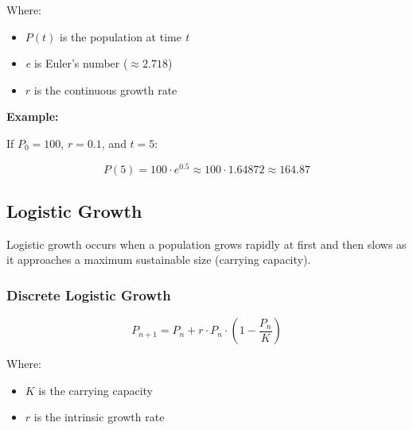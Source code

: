 Where:

\begin{itemize}

  \item \(P(t)\) is the population at time \emph{t}

  \item \emph{e} is Euler’s number (\(\approx 2.718\))

  \item \(r\) is the continuous growth rate

\end{itemize}

\textbf{Example:}
\vspace{\baselineskip}
  
If \(P_0 = 100\), \(r = 0.1\), and \(t = 5\):

\[
    P(5) = 100 \cdot e^{0.5} \approx 100 \cdot 1.64872 \approx 164.87
\]

\begin{center}
\end{center}

\subsection{Logistic Growth}

Logistic growth occurs when a population grows rapidly at first and then slows as it approaches a maximum sustainable size (carrying capacity).

\subsubsection{Discrete Logistic Growth}

\[
    P_{n+1} = P_n + r \cdot P_n \cdot \left(1 - \frac{P_n}{K}\right)
\]

Where:

\begin{itemize}

  \item \(K\) is the carrying capacity

  \item \(r\) is the intrinsic growth rate

\end{itemize}

